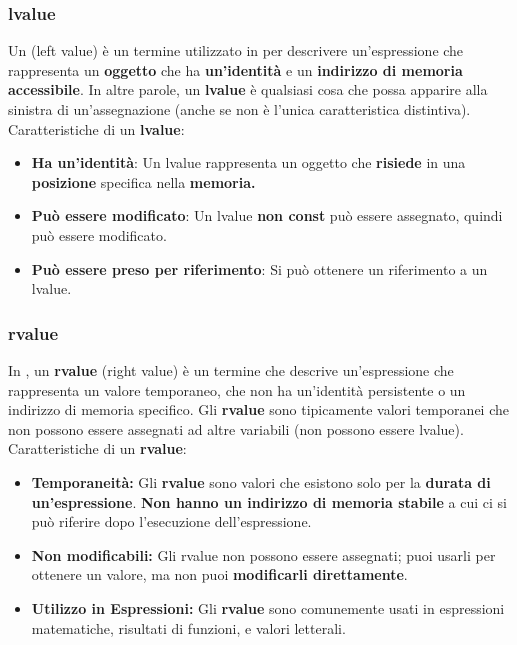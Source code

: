 \subsubsection{lvalue}
Un \textcolor{blue}{} (left value) è un termine utilizzato in  per descrivere un'espressione che rappresenta un \textbf{oggetto} che ha \textbf{un'identità} e un \textbf{indirizzo di memoria accessibile}. In altre parole, un \textbf{lvalue} è qualsiasi cosa che possa apparire alla sinistra di un'assegnazione (anche se non è l'unica caratteristica distintiva).\newline\newline
Caratteristiche di un \textbf{lvalue}:
\begin{itemize}
    \item \textbf{Ha un'identità}: Un lvalue rappresenta un oggetto che \textbf{risiede} in una \textbf{posizione} specifica nella \textbf{memoria.}
    \item \textbf{Può essere modificato}: Un lvalue \textbf{non const} può essere assegnato, quindi può essere modificato.
    \item \textbf{Può essere preso per riferimento}: Si può ottenere un \textbf{}riferimento a un lvalue.
\end{itemize}

 \begin{tcolorbox}[width=14cm, boxsep=10pt]
    
\end{tcolorbox}
\newpage
\subsubsection{rvalue}
In , un \textbf{rvalue} (right value) è un termine che descrive un'espressione che rappresenta un valore temporaneo, che non ha un'identità persistente o un indirizzo di memoria specifico. Gli \textbf{rvalue} sono tipicamente valori temporanei che non possono essere assegnati ad altre variabili (non possono essere lvalue).\newline\newline
Caratteristiche di un \textbf{rvalue}:
\begin{itemize}
\item \textbf{Temporaneità:} Gli \textbf{rvalue} sono valori che esistono solo per la \textbf{durata di un'espressione}.  \textbf{Non hanno un indirizzo di memoria stabile} a cui ci si può riferire dopo l'esecuzione dell'espressione.
\item \textbf{Non modificabili:} Gli rvalue non possono essere assegnati; puoi usarli per ottenere un valore, ma non puoi \textbf{modificarli direttamente}.
\item \textbf{Utilizzo in Espressioni:} Gli \textbf{rvalue} sono comunemente usati in espressioni matematiche, risultati di funzioni, e valori letterali.
\end{itemize}

